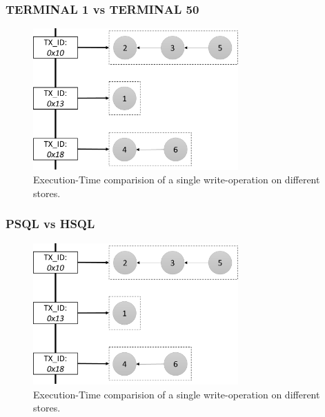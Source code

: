 


\subsubsection{TERMINAL 1 vs TERMINAL 50 } 
\begin{figure}[t] 
    \centering 
    \includegraphics[width=0.7\textwidth]{Figures/store_comparision.png}
    \caption{Execution-Time comparision of a single write-operation on different stores.}
    \label{fig:store_comparision}
\end{figure}



\subsubsection{PSQL vs HSQL } 
\begin{figure}[t] 
    \centering 
    \includegraphics[width=0.7\textwidth]{Figures/store_comparision.png}
    \caption{Execution-Time comparision of a single write-operation on different stores.}
    \label{fig:store_comparision}
\end{figure}

